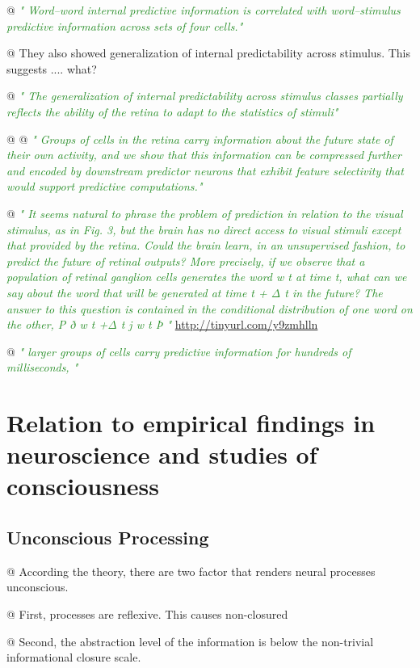 \documentclass[utf8]{article}
\newenvironment{ants}
			{
			 \begin{easylist}[itemize]		
		 	}
			{
			\end{easylist}
			}
\newcommand{\rewrite}[1]{\textcolor{ForestGreen}{\textit{"#1"}}\newline}
\begin{document}
\begin{ants}
			@ \rewrite{
				Word–word internal predictive information is correlated with word–stimulus predictive information across sets of four cells.}
			
			@ They also showed generalization of internal predictability across stimulus. This suggests .... what?
			
			@ \rewrite{
				The generalization of internal predictability across stimulus classes partially reflects the ability of the retina to adapt to the statistics of stimuli}
			
			
			@ \cite{Palmer2015}
			@ \rewrite{
				Groups of cells in the retina carry information about the future state of their own activity, and we show that this information can be compressed further and encoded by downstream predictor neurons that exhibit feature selectivity that would support predictive computations.}
			
			@ \rewrite{
				It seems natural to phrase the problem of prediction in relation to the visual stimulus, as in Fig. 3, but the brain has no direct access to visual stimuli except that provided by the retina. Could the brain learn, in an unsupervised fashion, to predict the future of retinal outputs? More precisely, if we observe that a population of retinal ganglion cells generates the word w t at time t, what can we say about the word that will be generated at time t + Δ t in the future? The answer to this question is contained in the conditional distribution of one word on the other, P ð w t +Δ t j w t Þ } \url{http://tinyurl.com/y9zmhlln}	
			
			@ \rewrite{
				larger groups of cells carry predictive information for hundreds of milliseconds, }
		
		\end{ants}




	\section{Relation to empirical findings in neuroscience and studies of consciousness}
	
		\subsection{Unconscious Processing}
			\begin{ants}
				@ According the theory, there are two factor that renders neural processes unconscious. 
				
				@ First, processes are reflexive. This causes non-closured
				
				@ Second, the abstraction level of the information is below the non-trivial informational closure scale. 
			\end{ants}
		
\end{document}
